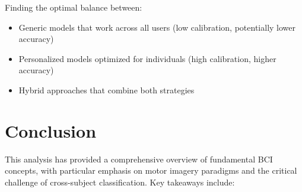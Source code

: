 \documentclass[12pt]{article}
\begin{document}
Finding the optimal balance between:
\begin{itemize}
    \item Generic models that work across all users (low calibration, potentially lower accuracy)
    \item Personalized models optimized for individuals (high calibration, higher accuracy)
    \item Hybrid approaches that combine both strategies
\end{itemize}

\section{Conclusion}

This analysis has provided a comprehensive overview of fundamental BCI concepts, with particular emphasis on motor imagery paradigms and the critical challenge of cross-subject classification. Key takeaways include:
\end{document}
